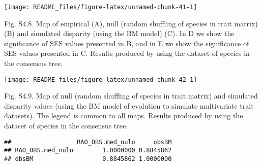 \documentclass[
]{article}
\begin{document}
\begin{center}\texttt{[image: README\_files/figure-latex/unnamed-chunk-41-1]} \end{center}

Fig. S4.8. Map of empirical (A), null (random shuffling of species in
trait matrix) (B) and simulated disparity (using the BM model) (C). In D
we show the significance of SES values presented in B, and in E we show
the significance of SES values presented in C. Results produced by using
the dataset of species in the consensus tree.

\begin{center}\texttt{[image: README\_files/figure-latex/unnamed-chunk-42-1]} \end{center}

Fig. S4.9. Map of null (random shuffling of species in trait matrix) and
simulated disparity values (using the BM model of evolution to simulate
multivariate trait datasets). The legend is common to all maps. Results
produced by using the dataset of species in the consensus tree.

\begin{verbatim}
##                  RAO_OBS.med_nulo     obsBM
## RAO_OBS.med_nulo        1.0000000 0.8845862
## obsBM                   0.8845862 1.0000000
\end{verbatim}
\end{document}
